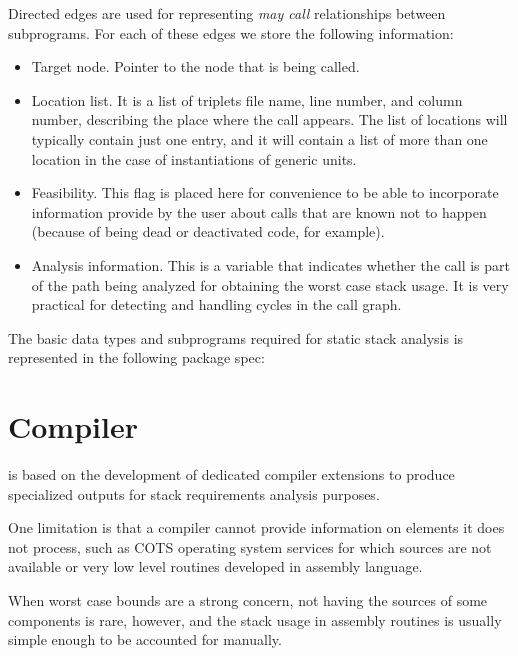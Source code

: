Directed edges are used for representing \emph{may call}
relationships between subprograms. For each of these edges we store
the following information:
 
\begin{itemize}

\item Target node. Pointer to the node that is being called.

\item Location list. It is a list of triplets file name, line number,
 and column number, describing the place where the call
 appears. The list of locations will typically contain just one entry,
 and it will contain a list of more than one location in the case of
 instantiations of generic units.

\item Feasibility. This flag is placed here for convenience to be able
  to incorporate information provide by the user about calls that are
  known not to happen (because of being dead or deactivated code, for
  example).

\item Analysis information. This is a  variable that
  indicates whether the call is part of the path being analyzed
  for obtaining the worst case stack usage. It is very practical for
  detecting and handling cycles in the call graph.

\end{itemize}

The basic data types and subprograms required for static stack
analysis is represented in the following package spec:


\section{Compiler}

\ssat{} is based on the development of  dedicated compiler extensions
to produce specialized outputs for stack requirements analysis
purposes.

One limitation is that a compiler cannot provide information on elements it
does not process, such as COTS operating system services for which sources are
not available or very low level routines developed in assembly language.

When worst case bounds are a strong concern, not having the sources of some
components is rare, however, and the stack usage in assembly routines is
usually simple enough to be accounted for manually.

